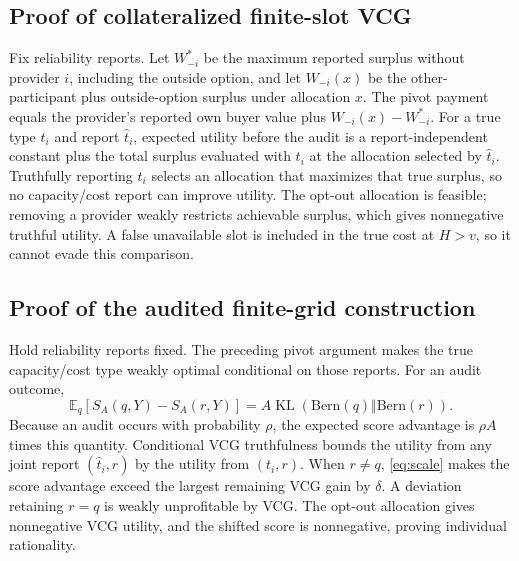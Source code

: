 \documentclass[11pt]{article}
\theoremstyle{definition}
\newcommand{\KL}{\operatorname{KL}}
\newcommand{\E}{\mathbb{E}}
\begin{document}
\subsection{Proof of collateralized finite-slot VCG}
Fix reliability reports. Let $W_{-i}^*$ be the maximum reported surplus
without provider $i$, including the outside option, and let $W_{-i}(x)$ be the
other-participant plus outside-option surplus under allocation $x$. The pivot
payment equals the provider's reported own buyer value plus
$W_{-i}(x)-W_{-i}^*$. For a true type $t_i$ and report $\hat t_i$, expected
utility before the audit is a report-independent constant plus the total
surplus evaluated with $t_i$ at the allocation selected by $\hat t_i$.
Truthfully reporting $t_i$ selects an allocation that maximizes that true
surplus, so no capacity/cost report can improve utility. The opt-out allocation
is feasible; removing a provider weakly restricts achievable surplus, which
gives nonnegative truthful utility. A false unavailable slot is included in
the true cost at $H>v$, so it cannot evade this comparison.

\subsection{Proof of the audited finite-grid construction}
Hold reliability reports fixed. The preceding pivot argument makes the true
capacity/cost type weakly optimal conditional on those reports. For an audit
outcome,
\[
 \E_q[S_A(q,Y)-S_A(r,Y)]
 =A\KL(\mathrm{Bern}(q)\Vert\mathrm{Bern}(r)).
\]
Because an audit occurs with probability $\rho$, the expected score advantage
is $\rho A$ times this quantity. Conditional VCG truthfulness bounds the
utility from any joint report $(\hat t_i,r)$ by the utility from $(t_i,r)$.
When $r\ne q$, \cref{eq:scale} makes the score advantage exceed the largest
remaining VCG gain by $\delta$. A deviation retaining $r=q$ is weakly
unprofitable by VCG. The opt-out allocation gives nonnegative VCG utility, and
the shifted score is nonnegative, proving individual rationality.
\end{document}
